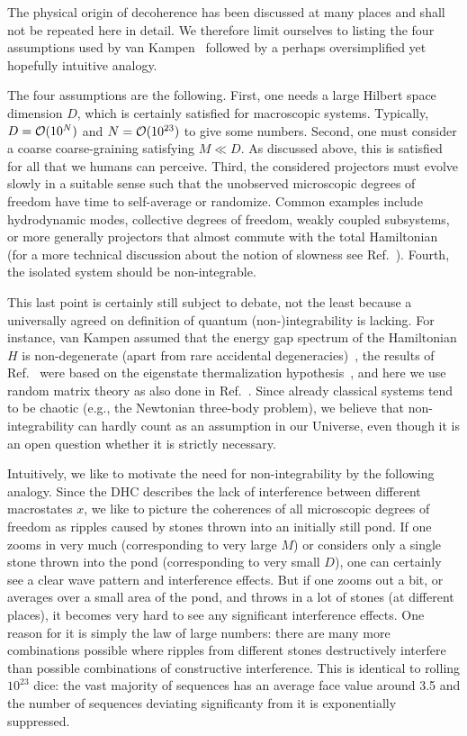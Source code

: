 \documentclass[pre,onecolumn,12pt,aps,longbibliography,nofootinbib]{revtex4-2}
\newcommand{\C}[1]{{\cal{#1}}}
\newcommand{\blue}[1]{#1}
\begin{document}
The physical origin of decoherence has been discussed at many places and shall not be repeated here in detail. We therefore limit ourselves to listing the four assumptions used by van Kampen~\cite{VanKampenPhys1954} followed by a perhaps oversimplified yet hopefully intuitive analogy.

The four assumptions are the following. First, one needs a large Hilbert space dimension $D$, which is certainly satisfied for macroscopic systems. Typically, $D=\C O(10^N)$ and $N=\C O(10^{23})$ to give some numbers. Second, one must consider a coarse coarse-graining satisfying $M\ll D$. As discussed above, this is satisfied for all that we humans can perceive. Third, the considered projectors must evolve slowly in a suitable sense such that the unobserved microscopic degrees of freedom have time to self-average or randomize. Common examples include hydrodynamic modes, collective degrees of freedom, weakly coupled subsystems, or more generally projectors that almost commute with the total Hamiltonian \blue{(for a more technical discussion about the notion of slowness see Ref.~\cite{StrasbergEtAlPRA2023})}. Fourth, the isolated system should be non-integrable.

This last point is certainly still subject to debate, not the least because a universally agreed on definition of quantum (non-)integrability is lacking. For instance, van Kampen assumed that the energy gap spectrum of the Hamiltonian $H$ is non-degenerate (apart from rare accidental degeneracies)~\cite{VanKampenPhys1954}, the results of Ref.~\cite{GemmerSteinigewegPRE2014, SchmidtkeGemmerPRE2016, NationPorrasPRE2020, StrasbergEtAlPRA2023} were based on the eigenstate thermalization hypothesis~\cite{DAlessioEtAlAP2016, DeutschRPP2018}, and here we use random matrix theory as also done in Ref.~\cite{NationPorrasPRE2020, StrasbergSP2023}. Since already classical systems tend to be chaotic (e.g., the Newtonian three-body problem), we believe that non-integrability can hardly count as an assumption in our Universe, even though it is an open question whether it is strictly necessary.

Intuitively, we like to motivate the need for non-integrability by the following analogy. Since the DHC describes the lack of interference between different macrostates $x$, we like to picture the coherences of all microscopic degrees of freedom as ripples caused by stones thrown into an initially still pond. If one zooms in very much (corresponding to very large $M$) or considers only a single stone thrown into the pond (corresponding to very small $D$), one can certainly see a clear wave pattern and interference effects. But if one zooms out a bit, or averages over a small area of the pond, and throws in a lot of stones (at different places), it becomes very hard to see any significant interference effects. One reason for it is simply the law of large numbers: there are many more combinations possible where ripples from different stones destructively interfere than possible combinations of constructive interference. This is identical to rolling $10^{23}$ dice: the vast majority of sequences has an average face value around 3.5 and the number of sequences deviating significanty from it is exponentially suppressed.
\end{document}
